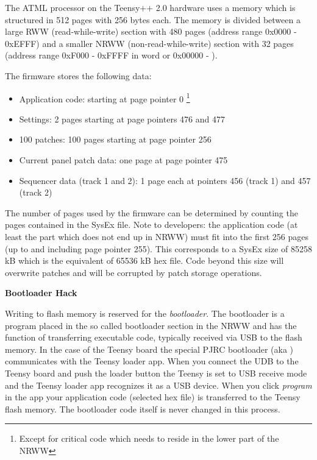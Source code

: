 The ATML processor on the Teensy++ 2.0 hardware uses a memory which is structured in 512 pages with 256 bytes each. The memory is divided between a large RWW (read-while-write) section with 480 pages (address range 0x0000 - 0xEFFF) and a smaller NRWW (non-read-while-write) section with 32 pages (address range 0xF000 - 0xFFFF in word or 0x00000 - ).

The firmware stores the following data:

\begin{itemize}
  \item Application code: starting at page pointer 0 \footnote{Except for critical code which needs to reside in the lower part of the NRWW}
  \item Settings: 2 pages starting at page pointers 476 and 477 
  \item 100 patches: 100 pages starting at page pointer 256
  \item Current panel patch data: one page at page pointer 475
  \item Sequencer data (track 1 and 2): 1 page each at pointers 456 (track 1) and 457 (track 2)
\end{itemize}

The number of pages used by the firmware can be determined by counting the pages contained in the SysEx file. Note to developers: the application code (at least the part which does not end up in NRWW) must fit into the first 256 pages (up to and including page pointer 255). This corresponds to a SysEx size of 85258 kB which is the equivalent of 65536 kB hex file. Code beyond this size will overwrite patches and will be corrupted by patch storage operations.

\textbf{Bootloader Hack}

Writing to flash memory is reserved for the \textit{bootloader}. The bootloader is a program placed in the so called bootloader section in the NRWW and has the function of transferring executable code, typically received via USB to the flash memory. In the case of the Teensy board the special PJRC bootloader (aka ) communicates with the Teensy loader app. When you connect the UDB to the Teensy board and push the loader button the Teensy is set to USB receive mode and the Teensy loader app recognizes it as a USB device. When you click \textit{program} in the app your application code (selected hex file) is transferred to the Teensy flash memory. The bootloader code itself is never changed in this process.

